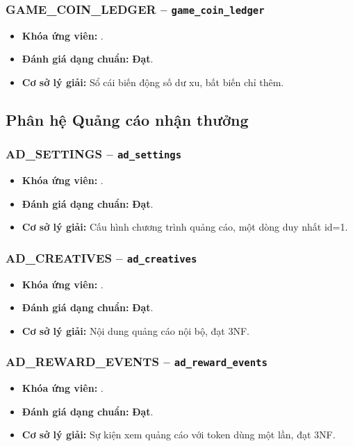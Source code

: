 \subsubsection{GAME_COIN_LEDGER -- \texttt{game\_coin\_ledger}}
\begin{itemize}
  \item \textbf{Khóa ứng viên:} \texttt{}.
  \item \textbf{Đánh giá dạng chuẩn:} \textbf{Đạt}.
  \item \textbf{Cơ sở lý giải:} Sổ cái biến động số dư xu, bất biến chỉ thêm.
\end{itemize}

\subsection{Phân hệ Quảng cáo nhận thưởng}
\subsubsection{AD_SETTINGS -- \texttt{ad\_settings}}
\begin{itemize}
  \item \textbf{Khóa ứng viên:} \texttt{}.
  \item \textbf{Đánh giá dạng chuẩn:} \textbf{Đạt}.
  \item \textbf{Cơ sở lý giải:} Cấu hình chương trình quảng cáo, một dòng duy nhất id=1.
\end{itemize}

\subsubsection{AD_CREATIVES -- \texttt{ad\_creatives}}
\begin{itemize}
  \item \textbf{Khóa ứng viên:} \texttt{}.
  \item \textbf{Đánh giá dạng chuẩn:} \textbf{Đạt}.
  \item \textbf{Cơ sở lý giải:} Nội dung quảng cáo nội bộ, đạt 3NF.
\end{itemize}

\subsubsection{AD_REWARD_EVENTS -- \texttt{ad\_reward\_events}}
\begin{itemize}
  \item \textbf{Khóa ứng viên:} \texttt{}.
  \item \textbf{Đánh giá dạng chuẩn:} \textbf{Đạt}.
  \item \textbf{Cơ sở lý giải:} Sự kiện xem quảng cáo với token dùng một lần, đạt 3NF.
\end{itemize}

